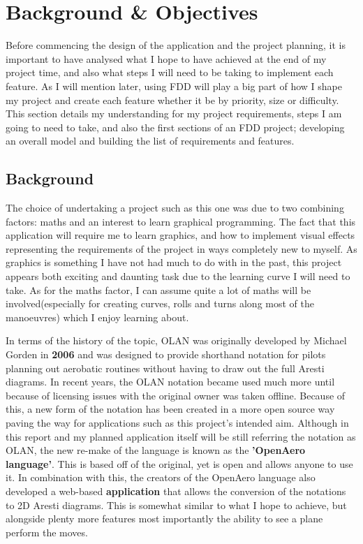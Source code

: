 \chapter{Background \& Objectives}
Before commencing the design of the application and the project planning, it is important to have analysed what I hope to have achieved at the end of my project time, and also what steps I will need to be taking to implement each feature. As I will mention later, using FDD will play a big part of how I shape my project and create each feature whether it be by priority, size or difficulty. This section details my understanding for my project requirements, steps I am going to need to take, and also the first sections of an FDD project; developing an overall model and building the list of requirements and features.

\section{Background}
The choice of undertaking a project such as this one was due to two combining factors: maths and an interest to learn graphical programming. The fact that this application will require me to learn graphics, and how to implement visual effects representing the requirements of the project in ways completely new to myself. As graphics is something I have not had much to do with in the past, this project appears both exciting and daunting task due to the learning curve I will need to take. As for the maths factor, I can assume quite a lot of maths will be involved(especially for creating curves, rolls and turns along most of the manoeuvres) which I enjoy learning about.

In terms of the history of the topic, OLAN was originally developed by Michael Gorden in \textbf{2006} and was designed to provide shorthand notation for pilots planning out aerobatic routines without having to draw out the full Aresti diagrams. In recent years, the OLAN notation became used much more until because of licensing issues with the original owner was taken offline. Because of this, a new form of the notation has been created in a more open source way paving the way for applications such as this project's intended aim. Although in this report and my planned application itself will be still referring the notation as OLAN, the new re-make of the language is known as the \textbf{'OpenAero language'}. This is based off of the original, yet is open and allows anyone to use it. In combination with this, the creators of the OpenAero language also developed a web-based \textbf{application} that allows the conversion of the notations to 2D Aresti diagrams. This is somewhat similar to what I hope to achieve, but alongside plenty more features most importantly the ability to see a plane perform the moves.

